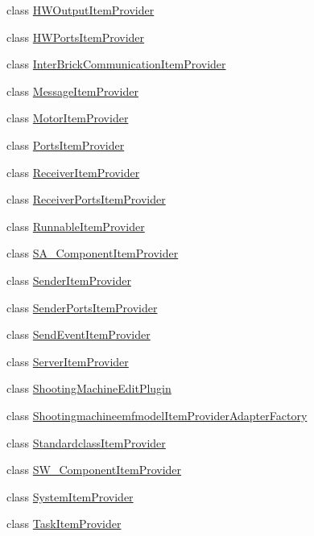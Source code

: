 \begin{DoxyCompactItemize}
class \hyperlink{classshootingmachineemfmodel_1_1provider_1_1_h_w_output_item_provider}{H\-W\-Output\-Item\-Provider}
\item 
class \hyperlink{classshootingmachineemfmodel_1_1provider_1_1_h_w_ports_item_provider}{H\-W\-Ports\-Item\-Provider}
\item 
class \hyperlink{classshootingmachineemfmodel_1_1provider_1_1_inter_brick_communication_item_provider}{Inter\-Brick\-Communication\-Item\-Provider}
\item 
class \hyperlink{classshootingmachineemfmodel_1_1provider_1_1_message_item_provider}{Message\-Item\-Provider}
\item 
class \hyperlink{classshootingmachineemfmodel_1_1provider_1_1_motor_item_provider}{Motor\-Item\-Provider}
\item 
class \hyperlink{classshootingmachineemfmodel_1_1provider_1_1_ports_item_provider}{Ports\-Item\-Provider}
\item 
class \hyperlink{classshootingmachineemfmodel_1_1provider_1_1_receiver_item_provider}{Receiver\-Item\-Provider}
\item 
class \hyperlink{classshootingmachineemfmodel_1_1provider_1_1_receiver_ports_item_provider}{Receiver\-Ports\-Item\-Provider}
\item 
class \hyperlink{classshootingmachineemfmodel_1_1provider_1_1_runnable_item_provider}{Runnable\-Item\-Provider}
\item 
class \hyperlink{classshootingmachineemfmodel_1_1provider_1_1_s_a___component_item_provider}{S\-A\-\_\-\-Component\-Item\-Provider}
\item 
class \hyperlink{classshootingmachineemfmodel_1_1provider_1_1_sender_item_provider}{Sender\-Item\-Provider}
\item 
class \hyperlink{classshootingmachineemfmodel_1_1provider_1_1_sender_ports_item_provider}{Sender\-Ports\-Item\-Provider}
\item 
class \hyperlink{classshootingmachineemfmodel_1_1provider_1_1_send_event_item_provider}{Send\-Event\-Item\-Provider}
\item 
class \hyperlink{classshootingmachineemfmodel_1_1provider_1_1_server_item_provider}{Server\-Item\-Provider}
\item 
class \hyperlink{classshootingmachineemfmodel_1_1provider_1_1_shooting_machine_edit_plugin}{Shooting\-Machine\-Edit\-Plugin}
\item 
class \hyperlink{classshootingmachineemfmodel_1_1provider_1_1_shootingmachineemfmodel_item_provider_adapter_factory}{Shootingmachineemfmodel\-Item\-Provider\-Adapter\-Factory}
\item 
class \hyperlink{classshootingmachineemfmodel_1_1provider_1_1_standardclass_item_provider}{Standardclass\-Item\-Provider}
\item 
class \hyperlink{classshootingmachineemfmodel_1_1provider_1_1_s_w___component_item_provider}{S\-W\-\_\-\-Component\-Item\-Provider}
\item 
class \hyperlink{classshootingmachineemfmodel_1_1provider_1_1_system_item_provider}{System\-Item\-Provider}
\item 
class \hyperlink{classshootingmachineemfmodel_1_1provider_1_1_task_item_provider}{Task\-Item\-Provider}
\end{DoxyCompactItemize}

